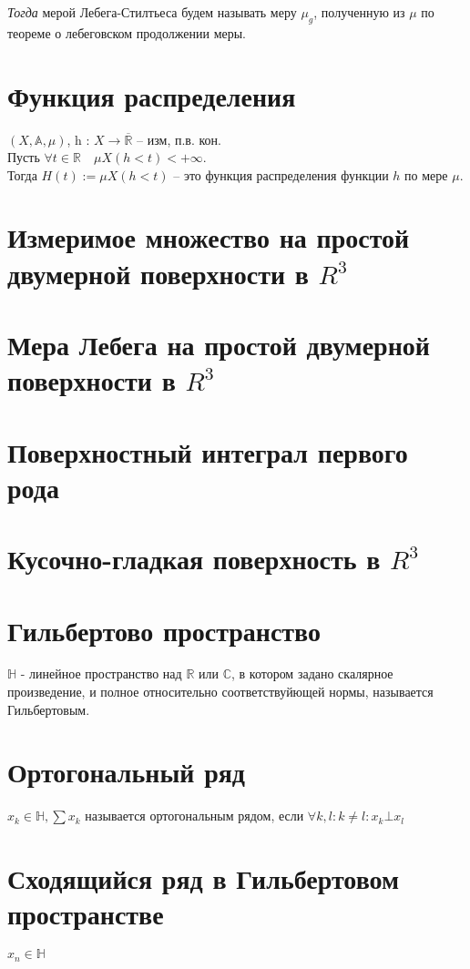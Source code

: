\documentclass[paper=a4, fontsize=17pt]{article}
\begin{document}
	
	\emph{Тогда} мерой Лебега-Стилтьеса будем называть меру $\mu_g$, полученную из $\mu$ по теореме о лебеговском продолжении меры.
	
	\section{Функция распределения}
	$(X, \mathds{A}, \mu) $, h : $X \rightarrow \overline{\mathbb{R}}$ -- изм, п.в. кон.\\
	
	Пусть $\forall t \in \mathbb{R}\quad \mu X(h < t) < +\infty$.\\
	Тогда $H(t):=\mu X(h < t)$ -- это функция распределения функции $h$ по мере $\mu$.
	
	\section{Измеримое множество на простой двумерной поверхности в $R^3$}
	
	\section{Мера Лебега на простой двумерной поверхности в $R^3$}
	
	\section{Поверхностный интеграл первого рода}
	
	\section{Кусочно-гладкая поверхность в $R^3$}
	
	\section{Гильбертово пространство}
	$\mathds{H}$ - линейное пространство над $\mathds{R}$ или $\mathds{C}$, в котором задано скалярное произведение, и полное относительно соответствуйющей нормы, называется Гильбертовым.
	
	\section{Ортогональный ряд}
	$x_k \in \mathds{H}, \sum x_k$ называется ортогональным рядом, если $\forall k, l: k \neq l: x_k \bot x_l$
	
	\section{Сходящийся ряд в Гильбертовом пространстве}
	$x_n \in \mathds{H}$
	
\end{document}
